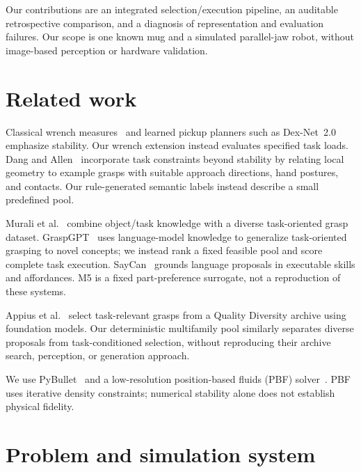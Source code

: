 \documentclass{article}
\begin{document}
Our contributions are an integrated selection/execution pipeline, an auditable retrospective comparison, and a diagnosis of representation and evaluation failures. Our scope is one known mug and a simulated parallel-jaw robot, without image-based perception or hardware validation.

\section{Related work}
Classical wrench measures~\citep{ferrari1992} and learned pickup planners such as Dex-Net~2.0~\citep{mahler2017} emphasize stability. Our wrench extension instead evaluates specified task loads. Dang and Allen~\citep{dang2012} incorporate task constraints beyond stability by relating local geometry to example grasps with suitable approach directions, hand postures, and contacts. Our rule-generated semantic labels instead describe a small predefined pool.

Murali et al.~\citep{murali2021} combine object/task knowledge with a diverse task-oriented grasp dataset. GraspGPT~\citep{tang2023} uses language-model knowledge to generalize task-oriented grasping to novel concepts; we instead rank a fixed feasible pool and score complete task execution. SayCan~\citep{ichter2023} grounds language proposals in executable skills and affordances. M5 is a fixed part-preference surrogate, not a reproduction of these systems.

Appius et al.~\citep{appius2025} select task-relevant grasps from a Quality Diversity archive using foundation models. Our deterministic multifamily pool similarly separates diverse proposals from task-conditioned selection, without reproducing their archive search, perception, or generation approach.

We use PyBullet~\citep{bullet} and a low-resolution position-based fluids (PBF) solver~\citep{macklin2013}. PBF uses iterative density constraints; numerical stability alone does not establish physical fidelity.

\section{Problem and simulation system}
\end{document}

